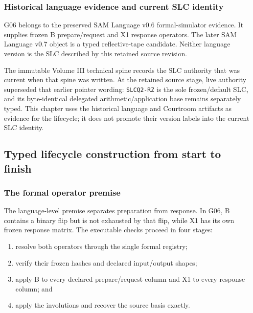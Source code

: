 \subsubsection{Historical language evidence and current SLC
identity}\label{viii-ch05-historical-language-evidence-and-current-slc-identity}

G06 belongs to the preserved SAM Language v0.6 formal-simulator
evidence. It supplies frozen B prepare/request and X1 response
operators. The later SAM Language v0.7 object is a typed reflective-tape
candidate. Neither language version is the SLC described by this
retained source revision.

The immutable Volume III technical spine records the SLC authority that
was current when that spine was written. At the retained source stage, live authority
superseded that earlier pointer wording: \texttt{SLCQ2-RZ} is the
sole frozen/default SLC, and its byte-identical delegated
arithmetic/application base remains separately typed. This chapter uses
the historical language and Courtroom artifacts as evidence for the
lifecycle; it does not promote their version labels into the current SLC
identity.

\subsection{Typed lifecycle construction from start to
finish}\label{viii-ch05-typed-lifecycle-construction-from-start-to-finish}

\subsubsection{The formal operator
premise}\label{viii-ch05-the-formal-operator-premise}

The language-level premise separates preparation from response. In G06,
B contains a binary flip but is not exhausted by that flip, while X1 has
its own frozen response matrix. The executable checks proceed in four
stages:

\begin{enumerate}
\def\labelenumi{\arabic{enumi}.}
\tightlist
\item
  resolve both operators through the single formal registry;
\item
  verify their frozen hashes and declared input/output shapes;
\item
  apply B to every declared prepare/request column and X1 to every
  response column; and
\item
  apply the involutions and recover the source basis exactly.
\end{enumerate}

